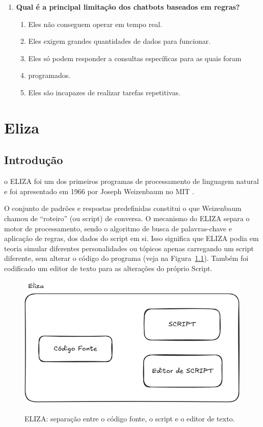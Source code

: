 \documentclass[14pt,a4paper,oneside]{book}
\begin{document}
\begin{enumerate}
\item \textbf{Qual é a principal limitação dos chatbots baseados em regras?}
\begin{enumerate}[label=\alph*)]
\item Eles não conseguem operar em tempo real. 
\item Eles exigem grandes quantidades de dados para funcionar. 
\item Eles só podem responder a consultas específicas para as quais foram \item programados. 
\item Eles são incapazes de realizar tarefas repetitivas. 
\end{enumerate}

\end{enumerate}


\chapter{Eliza}

\section{Introdução}

o ELIZA foi um dos primeiros programas de processamento de linguagem natural e foi apresentado em 1966 por Joseph Weizenbaum no MIT \cite{Weizenbaum1996}.

O conjunto de padrões e respostas predefinidas constitui o que Weizenbaum chamou de “roteiro” (ou script) de conversa. O mecanismo do ELIZA separa o motor de processamento, sendo o algoritmo de busca de palavras-chave e aplicação de regras, dos dados do script em si. 
Isso significa que ELIZA podia em teoria simular diferentes personalidades ou tópicos apenas carregando um script diferente, sem alterar o código do programa (veja na Figura~\ref{fig:elizaeditor}). Também foi codificado um editor de texto para as alterações do próprio Script.

\begin{figure}[!htbp]
	\centering	
	\caption{ELIZA: separação entre o código fonte, o script e o editor de texto.}
	\includegraphics[width=0.9\linewidth]{./fig/eliza.png}
	\label{fig:elizaeditor}
\end{figure}
\end{document}
